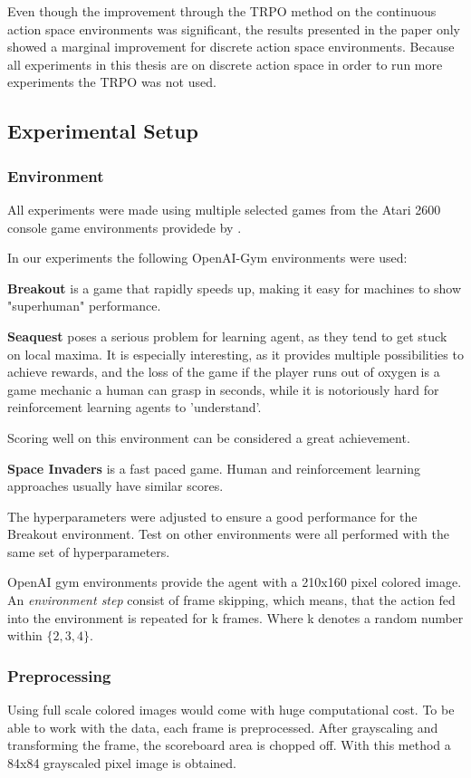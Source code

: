 Even though the improvement through the TRPO method on the continuous action space environments was significant, the results presented in the paper only showed a marginal improvement for discrete action space environments.
Because all experiments in this thesis are on discrete action space in order to run more experiments the TRPO was not used.

\subsection{Experimental Setup}

\subsubsection{Environment}
All experiments were made using multiple selected games from the Atari 2600 console game environments providede by \citet{openaigym}.

In our experiments the following OpenAI-Gym environments were used:

\textbf{Breakout} is a game that rapidly speeds up, making it easy for machines to show "superhuman" performance.

\textbf{Seaquest} poses a serious problem for learning agent, as they tend to get stuck on local maxima. It is especially interesting, as it provides multiple possibilities to achieve rewards, and the loss of the game if the player runs out of oxygen is a game mechanic a human can grasp in seconds, while it is notoriously hard for reinforcement learning agents to 'understand'.

Scoring well on this environment can be considered a great achievement.

\textbf{Space Invaders} is a fast paced game. Human and reinforcement learning approaches usually have similar scores. \citep{mnih2015atari}

The hyperparameters were adjusted to ensure a good performance for the Breakout environment. Test on other environments were all performed with the same set of hyperparameters.


OpenAI gym environments provide the agent with a 210x160 pixel colored image. An \textit{environment step} consist of frame skipping, which means, that the action fed into the environment is repeated for k frames. Where k denotes a random number within $\{2,3,4\}$.
\subsubsection{Preprocessing}
Using full scale colored images would come with huge computational cost. To be able to work with the data, each frame is preprocessed.
After grayscaling and transforming the frame, the scoreboard area is chopped off. With this method a 84x84 grayscaled pixel image is obtained. 

